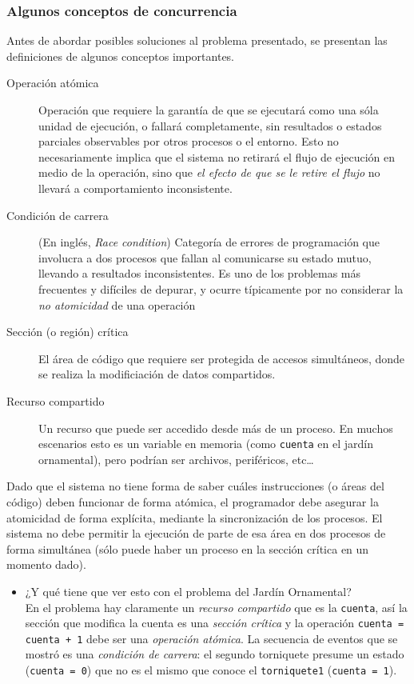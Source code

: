 \documentclass[11pt,fleqn]{book} %
\begin{document}
\subsubsection{Algunos conceptos de concurrencia}
\label{sec-3-3-2-2}


Antes de abordar posibles soluciones al problema presentado, se
presentan las definiciones de algunos conceptos importantes.

\begin{description}
\item[Operación atómica] Operación que requiere la garantía de que se
     ejecutará como una sóla unidad de ejecución, o fallará
     completamente, sin resultados o estados parciales observables por
     otros procesos o el entorno. Esto no necesariamente implica que
     el sistema no retirará el flujo de ejecución en medio de la
     operación, sino que \emph{el efecto de que se le retire el flujo} no
     llevará a comportamiento inconsistente.
\item[Condición de carrera] (En inglés, \emph{Race condition}) Categoría de errores de
     programación que involucra a dos procesos que fallan al comunicarse
     su estado mutuo, llevando a resultados inconsistentes. Es uno de
     los problemas más frecuentes y difíciles de depurar, y ocurre
     típicamente por no considerar la \emph{no atomicidad} de una operación
\item[Sección (o región) crítica] El área de código que requiere ser protegida de
     accesos simultáneos, donde se realiza la modificiación de datos
     compartidos.
\item[Recurso compartido] Un recurso que puede ser accedido desde más de
     un proceso. En muchos escenarios esto es un variable en memoria 
     (como \texttt{cuenta} en el jardín ornamental),
     pero podrían ser archivos, periféricos, etc\ldots{}
\end{description}

Dado que el sistema no tiene forma de saber cuáles instrucciones (o
áreas del código) deben funcionar de forma atómica, el programador debe asegurar
la atomicidad de forma explícita, mediante la sincronización de los
procesos. El sistema no debe permitir la ejecución de parte de esa
área en dos procesos de forma simultánea (sólo puede haber un proceso
en la sección crítica en un momento dado).
\begin{itemize}

\item ¿Y qué tiene que ver esto con el problema del Jardín Ornamental?\\
\label{sec-3-3-2-2-1}%
En el problema hay claramente un \emph{recurso compartido} que es la \texttt{cuenta}, así la
sección que modifica la cuenta es una \emph{sección crítica} y la operación
\texttt{cuenta = cuenta + 1} debe ser una \emph{operación atómica}. La secuencia de eventos que
se mostró es una \emph{condición de carrera}: el segundo torniquete presume
un estado (\texttt{cuenta = 0}) que no es el mismo que conoce el \texttt{torniquete1}
(\texttt{cuenta = 1}).

\end{itemize} %
\end{document}
